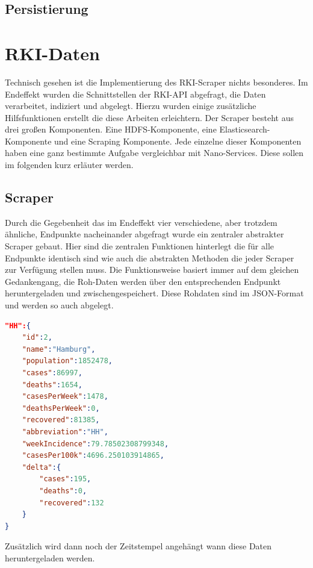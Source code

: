 \documentclass[12pt,oneside,a4paper,parskip]{scrbook}
\begin{document}
\subsection{Persistierung}

\section{RKI-Daten}
Technisch gesehen ist die Implementierung des RKI-Scraper nichts besonderes. Im Endeffekt wurden die Schnittstellen der RKI-API abgefragt, die Daten verarbeitet, indiziert und abgelegt. Hierzu wurden einige zus\"atzliche Hilfsfunktionen erstellt die diese Arbeiten erleichtern. \newline
Der Scraper besteht aus drei großen Komponenten. Eine HDFS-Komponente, eine Elasticsearch-Komponente und eine Scraping Komponente. Jede einzelne dieser Komponenten haben eine ganz bestimmte Aufgabe vergleichbar mit Nano-Services. Diese sollen im folgenden kurz erl\"auter werden.
\subsection{Scraper}
Durch die Gegebenheit das im Endeffekt vier verschiedene, aber trotzdem \"ahnliche, Endpunkte nacheinander abgefragt wurde ein zentraler abstrakter Scraper gebaut. Hier sind die zentralen Funktionen hinterlegt die f\"ur alle Endpunkte identisch sind wie auch die abstrakten Methoden die jeder Scraper zur Verf\"ugung stellen muss. \newline
Die Funktionsweise basiert immer auf dem gleichen Gedankengang, die Roh-Daten werden \"uber den entsprechenden Endpunkt heruntergeladen und zwischengespeichert. Diese Rohdaten sind im JSON-Format und werden so auch abgelegt.
\begin{lstlisting}[caption=Inzidenz Rohdaten der Corona-API ,label=incidencedataraw,language=json]
"HH":{
	"id":2,
	"name":"Hamburg",
	"population":1852478,
	"cases":86997,
	"deaths":1654,
	"casesPerWeek":1478,
	"deathsPerWeek":0,
	"recovered":81385,
	"abbreviation":"HH",
	"weekIncidence":79.78502308799348,
	"casesPer100k":4696.250103914865,
	"delta":{
		"cases":195,
		"deaths":0,
		"recovered":132
	}
}
\end{lstlisting}
Zus\"atzlich wird dann noch der Zeitstempel angeh\"angt wann diese Daten heruntergeladen werden.
\end{document}
